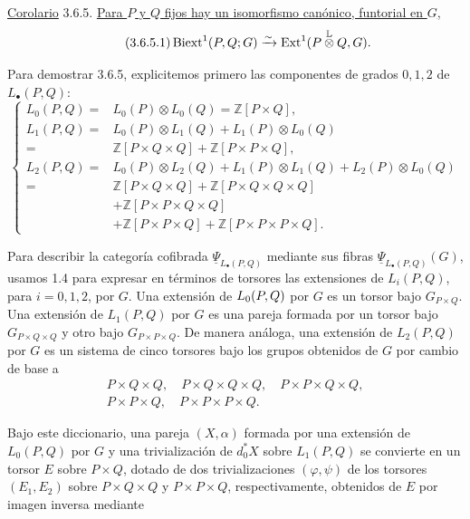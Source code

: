 
\underline{Corolario} 3.6.5. \underline{Para $P$ y $Q$ fijos hay un
isomorfismo canónico, funtorial en $G$,}
\begin{equation}\tag{3.6.5.1}
 \Biext^1(P,Q;G)
 \xrightarrow{\sim}
 \Ext^1(P\mathbin{\overset{\mathbb L}{\otimes}}Q,G).
\end{equation}

Para demostrar 3.6.5, explicitemos primero las componentes de grados
$0,1,2$ de $L_\bullet(P,Q)$:
\begin{equation}\tag{3.6.6}
\left\{
\begin{aligned}
 L_0(P,Q)
  ={}&L_0(P)\otimes L_0(Q)
     =\mathbb Z[P\times Q],\\
 L_1(P,Q)
  ={}&L_0(P)\otimes L_1(Q)+L_1(P)\otimes L_0(Q)\\
  ={}&\mathbb Z[P\times Q\times Q]
     +\mathbb Z[P\times P\times Q],\\
 L_2(P,Q)
  ={}&L_0(P)\otimes L_2(Q)+L_1(P)\otimes L_1(Q)
     +L_2(P)\otimes L_0(Q)\\
  ={}&\mathbb Z[P\times Q\times Q]
     +\mathbb Z[P\times Q\times Q\times Q]\\
   &+\mathbb Z[P\times P\times Q\times Q]\\
   &+\mathbb Z[P\times P\times Q]
     +\mathbb Z[P\times P\times P\times Q].
\end{aligned}
\right.
\end{equation}

Para describir la categoría cofibrada
$\underline\Psi_{L_\bullet(P,Q)}$ mediante sus fibras
$\underline\Psi_{L_\bullet(P,Q)}(G)$, usamos 1.4 para expresar en términos
de torsores las extensiones de $L_i(P,Q)$, para $i=0,1,2$, por $G$. Una
extensión de $\sisi{L_0(P\times Q)}{L_0(P,Q)}$ por $G$ es un torsor bajo
$G_{P\times Q}$. Una extensión de $L_1(P,Q)$ por $G$ es una pareja formada
por un torsor bajo $G_{P\times Q\times Q}$ y otro bajo
$G_{P\times P\times Q}$. De manera análoga, una extensión de $L_2(P,Q)$
por $G$ es un sistema de cinco torsores bajo los grupos obtenidos de $G$
por cambio de base a
\[
\begin{gathered}
 P\times Q\times Q,\quad
 P\times Q\times Q\times Q,\quad
 P\times P\times Q\times Q,\\
 P\times P\times Q,\quad
 P\times P\times P\times Q.
\end{gathered}
\]

Bajo este diccionario, una pareja $(X,\alpha)$ formada por una extensión
de $L_0(P,Q)$ por $G$ y una trivialización de $d_0^*X$ sobre $L_1(P,Q)$
se convierte en un torsor $E$ sobre $P\times Q$, dotado de dos
trivializaciones $(\varphi,\psi)$ de los torsores $(E_1,E_2)$ sobre
$P\times Q\times Q$ y $P\times P\times Q$, respectivamente, obtenidos
de $E$ por imagen inversa mediante

